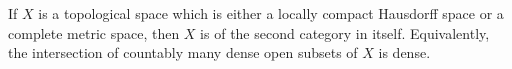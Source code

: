 If $X$ is a topological space which is either a locally compact Hausdorff space or a complete metric space, then $X$ is of the second category in itself. Equivalently, the intersection of countably many dense open subsets of $X$ is dense.
